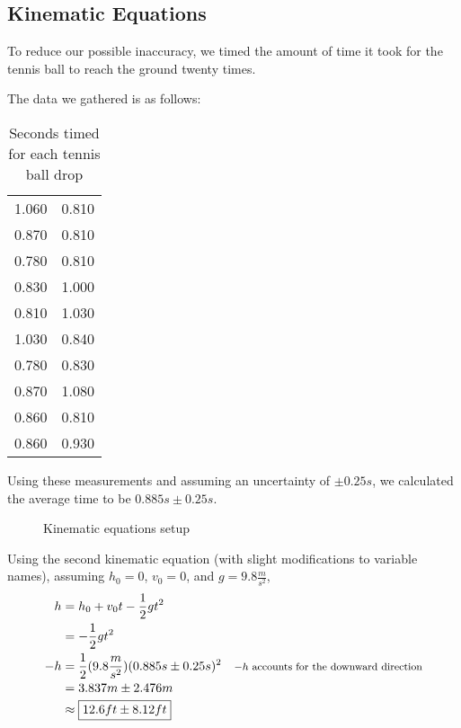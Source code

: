 \documentclass[12pt]{article}
\begin{document}
\subsection{Kinematic Equations}
To reduce our possible inaccuracy, we timed the amount of time it took for the tennis ball to reach the ground twenty times.\par
The data we gathered is as follows:
\begin{table}[H]
	\begin{tabular}{ll}
		1.060 & 0.810 \\
		0.870 & 0.810 \\
		0.780 & 0.810 \\
		0.830 & 1.000 \\
		0.810 & 1.030 \\
		1.030 & 0.840 \\
		0.780 & 0.830 \\
		0.870 & 1.080 \\
		0.860 & 0.810 \\
		0.860 & 0.930 \\
	\end{tabular}
	\caption{Seconds timed for each tennis ball drop}
	\label{tab:times}
\end{table}
Using these measurements and assuming an uncertainty of $\pm0.25s$, we calculated the average time to be $0.885s\pm0.25s$.
\par
\begin{figure}[H]
	\centering
    \caption{Kinematic equations setup}
\end{figure}

Using the second kinematic equation (with slight modifications to variable names), assuming $h_0=0$, $v_0=0$, and $g=9.8\frac{m}{s^2}$,
\begin{equation}
	\begin{aligned}
		h&=h_0+v_0t-\frac{1}{2}gt^2\\
		&=-\frac{1}{2}gt^2\\
		-h & =\frac{1}{2}(9.8\frac{m}{s^2})(0.885s\pm0.25s)^2 & \text{\footnotesize{$-h$ accounts for the downward direction}} \\
		&=3.837m\pm2.476m\\
		&\approx\boxed{12.6ft\pm8.12ft}
	\end{aligned}
\end{equation}
\end{document}
